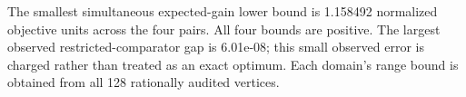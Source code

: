 The smallest simultaneous expected-gain lower bound is 1.158492 normalized objective units across the four pairs. All four bounds are positive. The largest observed restricted-comparator gap is 6.01e-08; this small observed error is charged rather than treated as an exact optimum. Each domain's range bound is obtained from all 128 rationally audited vertices.
